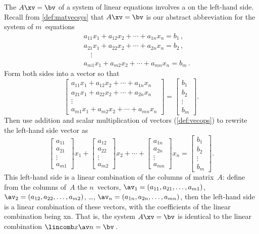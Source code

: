 \begin{example} \label{eg:lcmatvec}
The  \(A\xv=\bv\) of a system of linear equations involves a  on the left-hand side.
Recall from \autoref{def:matvecsys} that \(A\xv=\bv\) is our abstract abbreviation for the system of \(m\)~equations
\begin{eqnarray*}
&&a_{11}x_1+a_{12}x_2+\cdots+a_{1n}x_n=b_1\,,
\\&&a_{21}x_1+a_{22}x_2+\cdots+a_{2n}x_n=b_2\,,
\\&&\quad\vdots
\\&&a_{m1}x_1+a_{m2}x_2+\cdots+a_{mn}x_n=b_m\,.
\end{eqnarray*}
Form both sides into a vector so that
\begin{equation*}
\begin{bmatrix} 
a_{11}x_1+a_{12}x_2+\cdots+a_{1n}x_n
\\a_{21}x_1+a_{22}x_2+\cdots+a_{2n}x_n
\\\vdots
\\a_{m1}x_1+a_{m2}x_2+\cdots+a_{mn}x_n
\end{bmatrix}
=\begin{bmatrix}b_1\\b_2\\\vdots\\b_m \end{bmatrix}.
\end{equation*}
Then use addition and scalar multiplication of vectors (\autoref{def:vecops}) to rewrite the left-hand side vector as
\begin{equation*}
\begin{bmatrix} a_{11}\\a_{21}\\\vdots\\a_{m1}\end{bmatrix}x_1
+\begin{bmatrix} a_{12}\\a_{22}\\\vdots\\a_{m2}\end{bmatrix}x_2
+\cdots
+\begin{bmatrix} a_{1n}\\a_{2n}\\\vdots\\a_{mn}\end{bmatrix}x_n
=\begin{bmatrix} b_1\\b_2\\\vdots\\b_m \end{bmatrix}.
\end{equation*}
This left-hand side is a linear combination of the columns of matrix~\(A\): define from the columns of~\(A\) the \(n\)~vectors, \(\av_1=(a_{11},a_{21},\ldots,a_{m1})\), \(\av_2=(a_{12},a_{22},\ldots,a_{m2})\), \ldots, \(\av_n=(a_{1n},a_{2n},\ldots,a_{mn})\), then the left-hand side is a linear combination of these vectors, with the coefficients of the linear combination being \hlist xn.
That is, the system \(A\xv=\bv\) is identical to the linear combination \(\lincomb x\av n=\bv\)\,.
\end{example}

